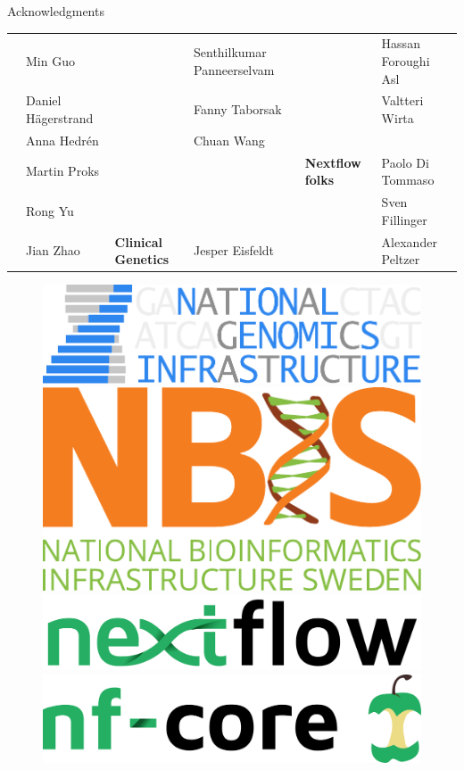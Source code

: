 \documentclass[usepdftitle=false]{beamer}
\begin{document}
\begin{frame}{Acknowledgments}
\begin{table}
{\begin{tabular}{llllll}
													&	Min Guo							&														&	Senthilkumar Panneerselvam	&															&	Hassan Foroughi Asl\\
													&	Daniel Hägerstrand	&														&	Fanny Taborsak							&															&	Valtteri Wirta\\
													&	Anna Hedrén					&														&	Chuan Wang									&															&	\\
													&	Martin Proks				&									&							&	\textbf{Nextflow folks}	&	Paolo Di Tommaso	\\
													&	Rong Yu							&									&							&													&	Sven Fillinger	\\
													&	Jian Zhao						&	\textbf{Clinical Genetics}		&	Jesper Eisfeldt			&		&	Alexander Peltzer	\\
		\end{tabular}}
	\end{table}
	\begin{figure}
		\includegraphics[height=.6cm]{pictures/NGI}%
		\hfill%
		\includegraphics[height=.6cm]{pictures/NBIS}%
		\hfill%
		\includegraphics[height=.6cm]{pictures/nextflow.png}%
		\hfill%
		\includegraphics[height=.6cm]{pictures/nf-core}%
	\end{figure}
\end{frame}
\end{document}
